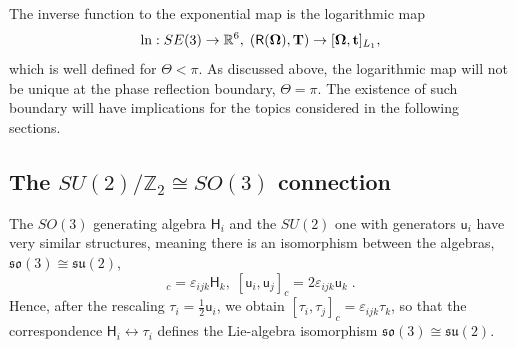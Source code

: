 \documentclass[journal]{IEEEtran}
\newcommand{\real}{\mathbb{R}}
\newcommand{\bfOmega}{\boldsymbol{\Omega}}
\newcommand{\beq}{\begin{equation}}
\newcommand{\eeq}{\end{equation}}
\begin{document}
The inverse function to the exponential map is the logarithmic map
\beq
    \ln: SE(3)\rightarrow\real^6,\; (\mathsf{R}(\bfOmega),{\bf T})\rightarrow [\bfOmega,{\bf t}]_{L_1},
    \label{eq:logarithmicmap}
\eeq
which is well defined for $\Theta<\pi$. As discussed above, the logarithmic map will not be
unique at the phase reflection boundary, $\Theta = \pi$. The existence of such boundary will have
implications for the topics considered in the following sections.

\subsection{The $SU(2)/\mathbb{Z}_2 \cong SO(3)$ connection}
\label{app:su2so3}
The $SO(3)$ generating algebra $\mathsf{H}_i$ and the $SU(2)$ one with generators $\mathsf{u}_i$
have very similar structures,
meaning there is an isomorphism between the algebras, $\mathfrak{so}(3) \cong \mathfrak{su}(2)$,
\beq
      [\mathsf{H}_i,\mathsf{H}_j]_c = \varepsilon_{ijk}\mathsf{H}_k,\;
      [\mathsf{u}_i,\mathsf{u}_j]_c = 2\varepsilon_{ijk}\mathsf{u}_k\;. \label{eq:su2-algebra-structure}
\eeq
Hence, after the rescaling $\tau_i = \tfrac{1}{2}\mathsf{u}_i$, we obtain
$[\tau_i,\tau_j]_c = \varepsilon_{ijk}\tau_k$, so that the correspondence
$\mathsf{H}_i \leftrightarrow \tau_i$ defines the Lie-algebra isomorphism
$\mathfrak{so}(3) \cong \mathfrak{su}(2)$.
\end{document}
